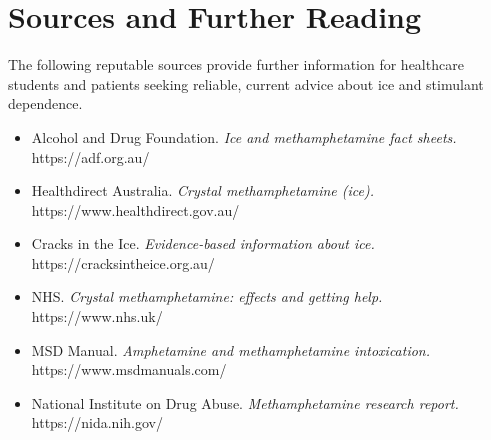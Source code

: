 \section*{Sources and Further Reading}
The following reputable sources provide further information for healthcare students and patients seeking reliable, current advice about ice and stimulant dependence.
\begin{itemize}
    \item Alcohol and Drug Foundation. \textit{Ice and methamphetamine fact sheets.} https://adf.org.au/
    \item Healthdirect Australia. \textit{Crystal methamphetamine (ice).} https://www.healthdirect.gov.au/
    \item Cracks in the Ice. \textit{Evidence-based information about ice.} https://cracksintheice.org.au/
    \item NHS. \textit{Crystal methamphetamine: effects and getting help.} https://www.nhs.uk/
    \item MSD Manual. \textit{Amphetamine and methamphetamine intoxication.} https://www.msdmanuals.com/
    \item National Institute on Drug Abuse. \textit{Methamphetamine research report.} https://nida.nih.gov/
\end{itemize}
